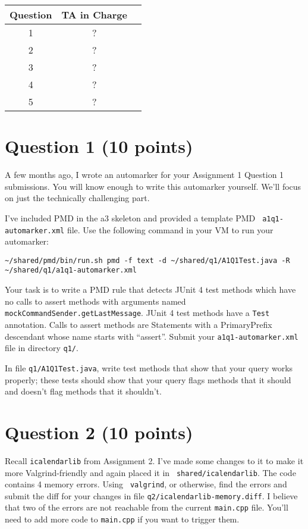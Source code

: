 \documentclass[10pt,hidelinks]{article}
\begin{document}
 \begin{center}
 \begin{tabular}{c|cc}
 Question   &  TA in Charge \\ \hline
1 & ? \\
2 & ? \\
3 & ? \\
4 & ? \\
5 & ?
 \end{tabular}
 \end{center}

\newpage
\section*{Question 1 (10 points)}
A few months ago, I wrote an automarker for your Assignment 1 Question 1 submissions.
You will know enough to write this automarker yourself. We'll focus on just the
technically challenging part.

I've included PMD in the a3 skeleton and provided a template PMD {\tt
  a1q1-automarker.xml} file. Use the following command in your VM to run your automarker:

\begin{verbatim}
~/shared/pmd/bin/run.sh pmd -f text -d ~/shared/q1/A1Q1Test.java -R ~/shared/q1/a1q1-automarker.xml
\end{verbatim}

Your task is to write a PMD rule that detects JUnit 4 test methods which have no calls to assert methods with arguments named {\tt mockCommandSender.getLastMessage}. JUnit 4 test methods have a {\tt Test} annotation. Calls to assert methods are Statements with a PrimaryPrefix descendant whose name starts with ``assert''. Submit your {\tt a1q1-automarker.xml} file in directory {\tt q1/}.

In file {\tt q1/A1Q1Test.java}, write test methods that show
that your query works properly; these tests should show that your query flags methods
that it should and doesn't flag methods that it shouldn't.

\section*{Question 2 (10 points)}

Recall {\tt icalendarlib} from Assignment 2. I've made some changes to
it to make it more Valgrind-friendly and again placed it in {\tt
  shared/icalendarlib}. The code contains 4 memory errors. Using {\tt
  valgrind}, or otherwise, find the errors and submit the diff for
your changes in file {\tt q2/icalendarlib-memory.diff}. I believe that two of
the errors are not reachable from the current {\tt main.cpp}
file. You'll need to add more code to {\tt main.cpp} if you want to
trigger them.
\end{document}
